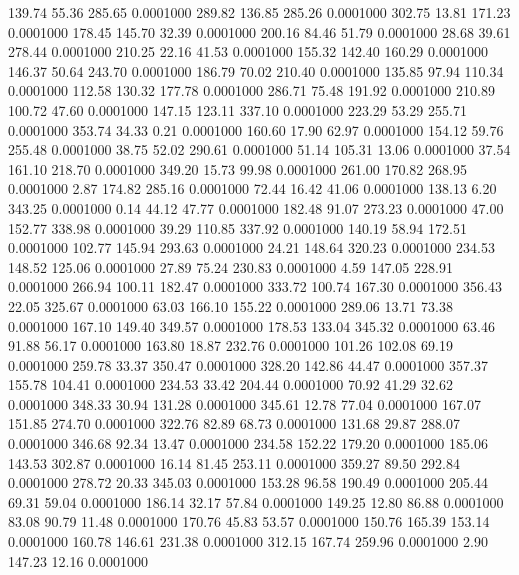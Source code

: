  139.74   55.36  285.65   0.0001000
 289.82  136.85  285.26   0.0001000
 302.75   13.81  171.23   0.0001000
 178.45  145.70   32.39   0.0001000
 200.16   84.46   51.79   0.0001000
  28.68   39.61  278.44   0.0001000
 210.25   22.16   41.53   0.0001000
 155.32  142.40  160.29   0.0001000
 146.37   50.64  243.70   0.0001000
 186.79   70.02  210.40   0.0001000
 135.85   97.94  110.34   0.0001000
 112.58  130.32  177.78   0.0001000
 286.71   75.48  191.92   0.0001000
 210.89  100.72   47.60   0.0001000
 147.15  123.11  337.10   0.0001000
 223.29   53.29  255.71   0.0001000
 353.74   34.33    0.21   0.0001000
 160.60   17.90   62.97   0.0001000
 154.12   59.76  255.48   0.0001000
  38.75   52.02  290.61   0.0001000
  51.14  105.31   13.06   0.0001000
  37.54  161.10  218.70   0.0001000
 349.20   15.73   99.98   0.0001000
 261.00  170.82  268.95   0.0001000
   2.87  174.82  285.16   0.0001000
  72.44   16.42   41.06   0.0001000
 138.13    6.20  343.25   0.0001000
   0.14   44.12   47.77   0.0001000
 182.48   91.07  273.23   0.0001000
  47.00  152.77  338.98   0.0001000
  39.29  110.85  337.92   0.0001000
 140.19   58.94  172.51   0.0001000
 102.77  145.94  293.63   0.0001000
  24.21  148.64  320.23   0.0001000
 234.53  148.52  125.06   0.0001000
  27.89   75.24  230.83   0.0001000
   4.59  147.05  228.91   0.0001000
 266.94  100.11  182.47   0.0001000
 333.72  100.74  167.30   0.0001000
 356.43   22.05  325.67   0.0001000
  63.03  166.10  155.22   0.0001000
 289.06   13.71   73.38   0.0001000
 167.10  149.40  349.57   0.0001000
 178.53  133.04  345.32   0.0001000
  63.46   91.88   56.17   0.0001000
 163.80   18.87  232.76   0.0001000
 101.26  102.08   69.19   0.0001000
 259.78   33.37  350.47   0.0001000
 328.20  142.86   44.47   0.0001000
 357.37  155.78  104.41   0.0001000
 234.53   33.42  204.44   0.0001000
  70.92   41.29   32.62   0.0001000
 348.33   30.94  131.28   0.0001000
 345.61   12.78   77.04   0.0001000
 167.07  151.85  274.70   0.0001000
 322.76   82.89   68.73   0.0001000
 131.68   29.87  288.07   0.0001000
 346.68   92.34   13.47   0.0001000
 234.58  152.22  179.20   0.0001000
 185.06  143.53  302.87   0.0001000
  16.14   81.45  253.11   0.0001000
 359.27   89.50  292.84   0.0001000
 278.72   20.33  345.03   0.0001000
 153.28   96.58  190.49   0.0001000
 205.44   69.31   59.04   0.0001000
 186.14   32.17   57.84   0.0001000
 149.25   12.80   86.88   0.0001000
  83.08   90.79   11.48   0.0001000
 170.76   45.83   53.57   0.0001000
 150.76  165.39  153.14   0.0001000
 160.78  146.61  231.38   0.0001000
 312.15  167.74  259.96   0.0001000
   2.90  147.23   12.16   0.0001000
